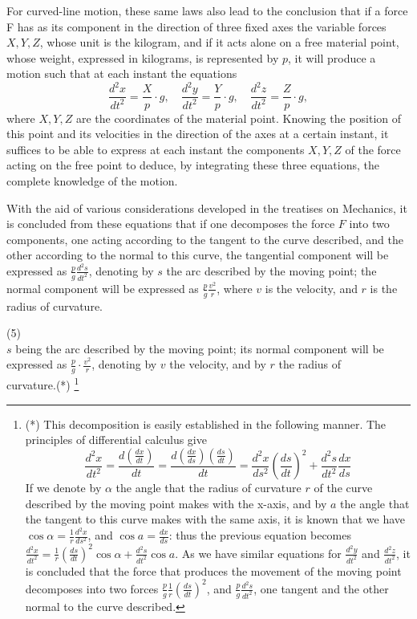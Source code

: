 \documentclass{book}
\begin{document}
For curved-line motion, these same laws also lead to the conclusion that if a force F has as its component in the direction of three fixed axes the variable forces \(X, Y, Z\), whose unit is the kilogram, and if it acts alone on a free material point, whose weight, expressed in kilograms, is represented by \(p\), it will produce a motion such that at each instant the equations
\[
\frac{d^2x}{dt^2} = \frac{X}{p} \cdot g, \quad \frac{d^2y}{dt^2} = \frac{Y}{p} \cdot g, \quad \frac{d^2z}{dt^2} = \frac{Z}{p} \cdot g,
\]
where \(X,Y,Z \) are the coordinates of the material point. Knowing the position of this point and its velocities in the direction of the axes at a certain instant, it suffices to be able to express at each instant the components \( X, Y, Z \) of the force acting on the free point to deduce, by integrating these three equations, the complete knowledge of the motion.

With the aid of various considerations developed in the treatises on Mechanics, it is concluded from these equations that if one decomposes the force \( F \) into two components, one acting according to the tangent to the curve described, and the other according to the normal to this curve, the tangential component will be expressed as \( \frac{p}{g} \frac{d^2s}{dt^2} \), denoting by \( s \) the arc described by the moving point; the normal component will be expressed as \( \frac{p}{g} \frac{v^2}{r} \), where \( v \) is the velocity, and \( r \) is the radius of curvature.




\newpage

(5)
\\
\( s \) being the arc described by the moving point; its normal component will be expressed as \( \frac{p}{g} \cdot \frac{v^2}{r} \), denoting by \( v \) the velocity, and by \( r \) the radius of\\ curvature.(*) \footnote{(*) This decomposition is easily established in the following manner. The principles of differential calculus give
\[
\frac{d^2x}{dt^2} = \frac{d \left( \frac{dx}{dt} \right)}{dt} = \frac{d \left( \frac{dx}{ds} \right) \left( \frac{ds}{dt} \right)}{dt} = \frac{d^2x}{ds^2} \left( \frac{ds}{dt} \right)^2 + \frac{d^2s}{dt^2} \frac{dx}{ds}
\]
If we denote by \( \alpha \) the angle that the radius of curvature \( r \) of the curve described by the moving point makes with the x-axis, and by \( a \) the angle that the tangent to this curve makes with the same axis, it is known that we have \( \cos \alpha = \frac{1}{r} \frac{d^2x}{ds^2} \), and \( \cos a = \frac{dx}{ds} \): thus the previous equation becomes \( \frac{d^2x}{dt^2} = \frac{1}{r} \left( \frac{ds}{dt} \right)^2 \cos \alpha + \frac{d^2s}{dt^2} \cos a \). As we have similar equations for \( \frac{d^2y}{dt^2} \) and \( \frac{d^2z}{dt^2} \), it is concluded that the force that produces the movement of the moving point decomposes into two forces \( \frac{p}{g} \frac{1}{r} \left( \frac{ds}{dt} \right)^2 \), and \( \frac{p}{g} \frac{d^2s}{dt^2} \), one tangent and the other normal to the curve described.}
\end{document}
